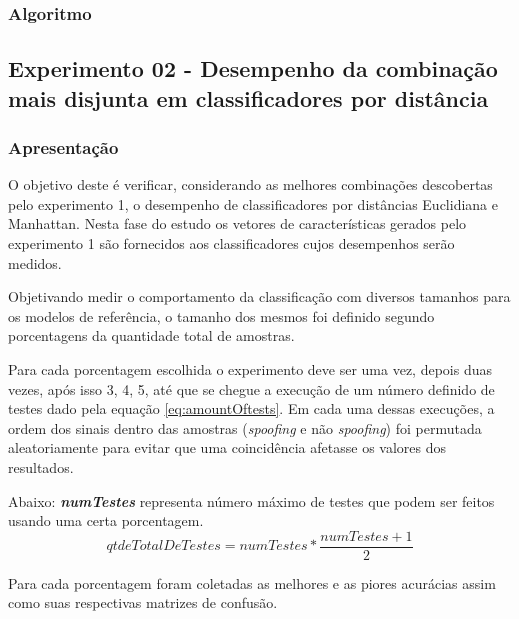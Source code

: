 \begin{myenv}{1.5}
				\subsubsection{Algoritmo}
				

			\subsection{Experimento 02 - Desempenho da combinação mais disjunta em classificadores por distância}
			\label{chap:propApproach:sec:Experimento01}
				\subsubsection{Apresentação}
					\par O objetivo deste é verificar, considerando as melhores combinações descobertas pelo experimento 1, o desempenho de classificadores por distâncias Euclidiana e Manhattan. Nesta fase do estudo os vetores de características gerados pelo experimento 1 são fornecidos aos classificadores cujos desempenhos serão medidos.
					
					\par Objetivando medir o comportamento da classificação com diversos tamanhos para os modelos de referência, o tamanho dos mesmos foi definido segundo porcentagens da quantidade total de amostras.
					
					\par Para cada porcentagem escolhida o experimento deve ser uma vez, depois duas vezes, após isso 3, 4, 5, até que se chegue a execução de um número definido de testes dado pela equação \ref{eq:amountOftests}. Em cada uma dessas execuções, a ordem dos sinais dentro das amostras (\textit{spoofing} e não \textit{spoofing}) foi permutada aleatoriamente para evitar que uma coincidência afetasse os valores dos resultados.
					
					\par Abaixo: \textit{\textbf{numTestes}} representa número máximo de testes que podem ser feitos usando uma certa porcentagem.
					\begin{equation}
						\label{eq:amountOftests}
						qtdeTotalDeTestes= numTestes * \dfrac{numTestes + 1}{2}
					\end{equation}
					
					\par Para cada porcentagem foram coletadas as melhores e as piores acurácias assim como suas respectivas matrizes de confusão.
					

\end{myenv}
